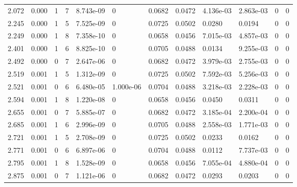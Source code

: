 \documentclass[preview]{standalone}
\begin{document}
{{\begin{tabular}{L{1.2cm}C{1.2cm} C{0.3cm}C{0.5cm} C{1.4cm}C{1.4cm} C{1.4cm}C{1.4cm} C{1.6cm}C{1.6cm} C{1.6cm}C{1.6cm}}
  2.072  &  0.000  & 1     &  7 &  8.743e-09  & 0  &  0.0682&   0.0472& 4.136e-03 & 2.863e-03   &  0 & 0  \\ 
  2.245  &  0.000  & 1     &  5 &  7.525e-09  & 0  &  0.0725&   0.0502& 0.0280 & 0.0194   &  0 & 0  \\ 
  2.249  &  0.000  & 1     &  8 &  7.358e-10  & 0  &  0.0658&   0.0456& 7.015e-03 & 4.857e-03   &  0 & 0  \\ 
  2.401  &  0.000  & 1     &  6 &  8.825e-10  & 0  &  0.0705&   0.0488& 0.0134 & 9.255e-03   &  0 & 0  \\ 
  2.492  &  0.000  & 0     &  7 &  2.647e-06  & 0  &  0.0682&   0.0472& 3.979e-03 & 2.755e-03   &  0 & 0  \\ 
  2.519  &  0.001  & 1     &  5 &  1.312e-09  & 0  &  0.0725&   0.0502& 7.592e-03 & 5.256e-03   &  0 & 0  \\ 
  2.521  &  0.001  & 0     &  6 &  6.480e-05  & 1.000e-06  &  0.0704&   0.0488& 3.218e-03 & 2.228e-03   &  0 & 0  \\ 
  2.594  &  0.001  & 1     &  8 &  1.220e-08  & 0  &  0.0658&   0.0456& 0.0450 & 0.0311   &  0 & 0  \\ 
  2.655  &  0.001  & 0     &  7 &  5.885e-07  & 0  &  0.0682&   0.0472& 3.185e-04 & 2.200e-04   &  0 & 0  \\ 
  2.685  &  0.001  & 1     &  6 &  2.996e-09  & 0  &  0.0705&   0.0488& 2.558e-03 & 1.771e-03   &  0 & 0  \\ 
  2.721  &  0.001  & 1     &  5 &  2.708e-09  & 0  &  0.0725&   0.0502& 0.0233 & 0.0162   &  0 & 0  \\ 
  2.771  &  0.001  & 0     &  6 &  6.897e-06  & 0  &  0.0704&   0.0488& 0.0112 & 7.737e-03   &  0 & 0  \\ 
  2.795  &  0.001  & 1     &  8 &  1.528e-09  & 0  &  0.0658&   0.0456& 7.055e-04 & 4.880e-04   &  0 & 0  \\ 
  2.875  &  0.001  & 0     &  7 &  1.121e-06  & 0  &  0.0682&   0.0472& 0.0293 & 0.0203   &  0 & 0  \\ 
\hline 
\end{tabular} 

}}
\end{document}

